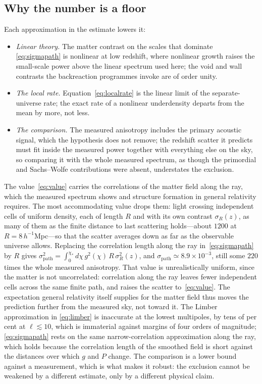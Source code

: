 \documentclass[twocolumn]{aastex701}
\begin{document}
\subsection{Why the number is a floor}

Each approximation in the estimate lowers it:
\begin{itemize}
\item \emph{Linear theory.} The matter contrast on the scales that dominate \eqref{eq:sigmapath} is nonlinear at low redshift, where nonlinear growth raises the small-scale power above the linear spectrum used here; the void and wall contrasts the backreaction programmes invoke are of order unity.
\item \emph{The local rate.} Equation~\eqref{eq:localrate} is the linear limit of the separate-universe rate; the exact rate of a nonlinear underdensity departs from the mean by more, not less.
\item \emph{The comparison.} The measured anisotropy includes the primary acoustic signal, which the hypothesis does not remove; the redshift scatter it predicts must fit inside the measured power together with everything else on the sky, so comparing it with the whole measured spectrum, as though the primordial and Sachs--Wolfe contributions were absent, understates the exclusion.
\end{itemize}
The value~\eqref{eq:value} carries the correlations of the matter field along the ray, which the measured spectrum shows and structure formation in general relativity requires. The most accommodating value drops them: light crossing independent cells of uniform density, each of length $R$ and with its own contrast $\sigma_R(z)$, as many of them as the finite distance to last scattering holds---about $1200$ at $R=8\,h^{-1}$Mpc---so that the scatter averages down as far as the observable universe allows. Replacing the correlation length along the ray in~\eqref{eq:sigmapath} by $R$ gives $\sigma^{2}_{\mathrm{path}}=\int_0^{\chi_*}d\chi\,g^{2}(\chi)\,R\,\sigma_R^{2}(z)$, and $\sigma_{\mathrm{path}}\simeq8.9\times10^{-3}$, still some $220$ times the whole measured anisotropy. That value is unrealistically uniform, since the matter is not uncorrelated: correlation along the ray leaves fewer independent cells across the same finite path, and raises the scatter to~\eqref{eq:value}. The expectation general relativity itself supplies for the matter field thus moves the prediction further from the measured sky, not toward it. The Limber approximation in \eqref{eq:limber} is inaccurate at the lowest multipoles, by tens of per cent at $\ell\lesssim10$, which is immaterial against margins of four orders of magnitude; \eqref{eq:sigmapath} rests on the same narrow-correlation approximation along the ray, which holds because the correlation length of the smoothed field is short against the distances over which $g$ and $P$ change. The comparison is a lower bound against a measurement, which is what makes it robust: the exclusion cannot be weakened by a different estimate, only by a different physical claim.
\end{document}
